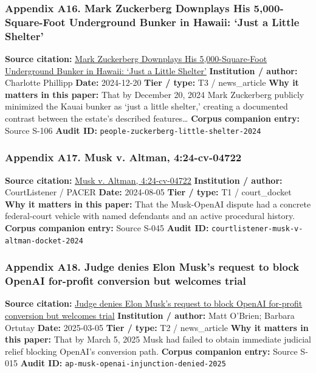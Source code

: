\documentclass[
  american,
  11pt,
  letterpaper,
]{article}
\begin{document}
\subsubsection{Appendix A16. Mark Zuckerberg Downplays His
5,000-Square-Foot Underground Bunker in Hawaii: `Just a Little
Shelter'}\label{appendix-a16-mark-zuckerberg-downplays-his-5-000-square-foot-underground-bunker-in-hawaii-just-a-little-shelter}

\textbf{Source citation:}
\href{https://people.com/mark-zuckerberg-hawaii-bunker-5000-square-feet-8765376}{Mark
Zuckerberg Downplays His 5,000-Square-Foot Underground Bunker in Hawaii:
`Just a Little Shelter'} \textbf{Institution / author:} Charlotte
Phillipp \textbf{Date:} 2024-12-20 \textbf{Tier / type:} T3 /
news\_article \textbf{Why it matters in this paper:} That by December
20, 2024 Mark Zuckerberg publicly minimized the Kauai bunker as `just a
little shelter,' creating a documented contrast between the estate's
described features\ldots{} \textbf{Corpus companion entry:} Source S-106
\textbf{Audit ID:} \texttt{people-zuckerberg-little-shelter-2024}

\subsubsection{Appendix A17. Musk v. Altman,
4:24-cv-04722}\label{appendix-a17-musk-v-altman-4-24-cv-04722}

\textbf{Source citation:}
\href{https://www.courtlistener.com/docket/69013420/musk-v-altman/}{Musk
v. Altman, 4:24-cv-04722} \textbf{Institution / author:} CourtListener /
PACER \textbf{Date:} 2024-08-05 \textbf{Tier / type:} T1 / court\_docket
\textbf{Why it matters in this paper:} That the Musk-OpenAI dispute had
a concrete federal-court vehicle with named defendants and an active
procedural history. \textbf{Corpus companion entry:} Source S-045
\textbf{Audit ID:} \texttt{courtlistener-musk-v-altman-docket-2024}

\subsubsection{Appendix A18. Judge denies Elon Musk's request to block
OpenAI for-profit conversion but welcomes
trial}\label{appendix-a18-judge-denies-elon-musk-s-request-to-block-openai-for-profit-conversion-but-welcomes-trial}

\textbf{Source citation:}
\href{https://apnews.com/article/elon-musk-openai-lawsuit-f5724e7ab07b5bed8292a1e8aa2ef695}{Judge
denies Elon Musk's request to block OpenAI for-profit conversion but
welcomes trial} \textbf{Institution / author:} Matt O'Brien; Barbara
Ortutay \textbf{Date:} 2025-03-05 \textbf{Tier / type:} T2 /
news\_article \textbf{Why it matters in this paper:} That by March 5,
2025 Musk had failed to obtain immediate judicial relief blocking
OpenAI's conversion path. \textbf{Corpus companion entry:} Source S-015
\textbf{Audit ID:} \texttt{ap-musk-openai-injunction-denied-2025}
\end{document}

